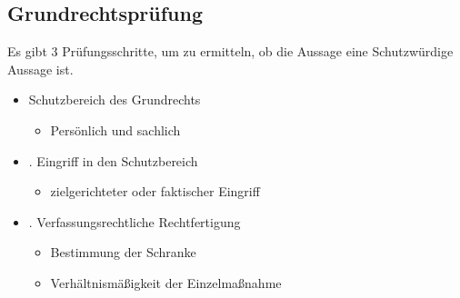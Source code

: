\subsection{Grundrechtsprüfung}
Es gibt 3 Prüfungsschritte, um zu ermitteln, ob die Aussage eine Schutzwürdige Aussage ist.
\begin{itemize}
    \item Schutzbereich des Grundrechts
        \begin{itemize}
            \item Persönlich und sachlich
        \end{itemize}
    \item . Eingriff in den Schutzbereich
        \begin{itemize}
            \item  zielgerichteter oder faktischer Eingriff
        \end{itemize}
            \item . Verfassungsrechtliche Rechtfertigung
        \begin{itemize}
            \item Bestimmung der Schranke
            \item Verhältnismäßigkeit der Einzelmaßnahme
    \end{itemize}
\end{itemize}
%
%
%
%
%

